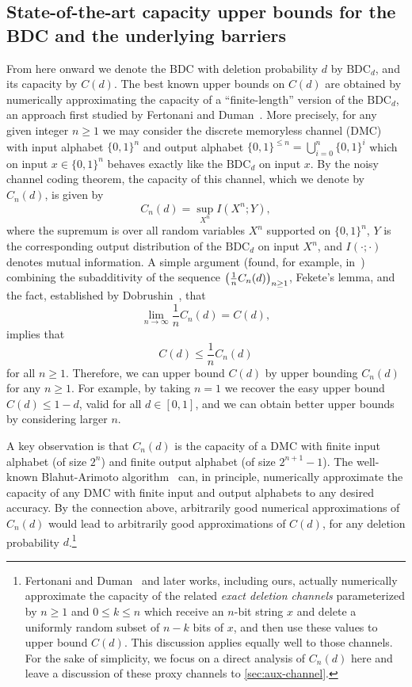 \documentclass[11pt]{article}
\newcommand{\bits}{\{0,1\}}
\newcommand{\BDC}{\mathrm{BDC}}
\newcommand{\fCap}{C}
\let\originalleft\left
\let\originalright\right
\renewcommand{\left}{\mathopen{}\mathclose\bgroup\originalleft}
\renewcommand{\right}{\aftergroup\egroup\originalright}
\begin{document}
\subsection{State-of-the-art capacity upper bounds for the BDC and the underlying barriers}
From here onward we denote the BDC with deletion probability $d$ by $\BDC_d$, and its capacity by $C(d)$. 
The best known upper bounds on $C(d)$ are obtained by numerically approximating the capacity of a ``finite-length'' version of the $\BDC_d$, an approach first studied by Fertonani and Duman~\cite{FD10}.
More precisely, for any given integer $n\geq 1$ we may consider the discrete memoryless channel (DMC) with input alphabet $\bits^n$ and output alphabet $\bits^{\leq n}=\bigcup_{i=0}^n \bits^i$ which on input $x\in\bits^n$ behaves exactly like the $\BDC_d$ on input $x$.
By the noisy channel coding theorem, the capacity of this channel, which we denote by $\fCap_n(d)$, is given by
\begin{equation*}
    \fCap_n(d) = \sup_{X^n}I(X^n;Y),
\end{equation*}
where the supremum is over all random variables $X^n$ supported on $\bits^n$, $Y$ is the corresponding output distribution of the $\BDC_d$ on input $X^n$, and $I(\cdot;\cdot)$ denotes mutual information.
A simple argument (found, for example, in~\cite{FD10,Dal11}) combining the subadditivity of the sequence $\left(\frac{1}{n}\fCap_n(d)\right)_{n\geq 1}$, Fekete's lemma, and the fact, established by Dobrushin~\cite{Dob67}, that
\begin{equation*}
    \lim_{n\to\infty}\frac{1}{n}\fCap_n(d) = C(d),
\end{equation*}
implies that
\begin{equation}\label{eq:fCap-UB}
    C(d)\leq \frac{1}{n}\fCap_n(d)
\end{equation}
for all $n\geq 1$.
Therefore, we can upper bound $C(d)$ by upper bounding $\fCap_n(d)$ for any $n\geq 1$.
For example, by taking $n=1$ we recover the easy upper bound $C(d)\leq 1-d$, valid for all $d\in[0,1]$, and we can obtain better upper bounds by considering larger $n$.

A key observation is that $\fCap_n(d)$ is the capacity of a DMC with finite input alphabet (of size $2^n$) and finite output alphabet (of size $2^{n+1}-1$).
The well-known Blahut-Arimoto algorithm~\cite{Ari72,Bla72} can, in principle, numerically approximate the capacity of any DMC with finite input and output alphabets to any desired accuracy.
By the connection above, arbitrarily good numerical approximations of $C_n(d)$ would lead to arbitrarily good approximations of $C(d)$, for any deletion probability $d$.\footnote{Fertonani and Duman~\cite{FD10} and later works, including ours, actually numerically approximate the capacity of the related \emph{exact deletion channels} parameterized by $n\geq 1$ and $0\leq k\leq n$ which receive an $n$-bit string $x$ and delete a uniformly random subset of $n-k$ bits of $x$, and then use these values to upper bound $C(d)$.
This discussion applies equally well to those channels.
For the sake of simplicity, we focus on a direct analysis of $\fCap_n(d)$ here and leave a discussion of these proxy channels to \cref{sec:aux-channel}.}
\end{document}
